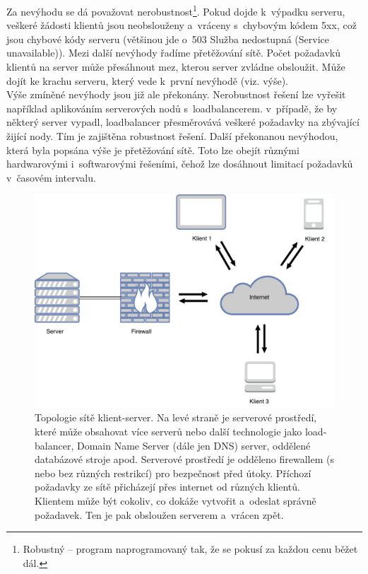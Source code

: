 
Za nevýhodu se dá považovat nerobustnost\footnote{Robustný -- program naprogramovaný tak, že se pokusí za každou cenu běžet dál.}. Pokud dojde k~výpadku serveru, veškeré žádosti klientů jsou neobslouženy a~vráceny s~chybovým kódem 5xx, což jsou chybové kódy serveru (většinou jde o~503 Služba nedostupná (Service unavailable)). Mezi další nevýhody řadíme přetěžování sítě. Počet požadavků klientů na server může přesáhnout mez, kterou server zvládne obsloužit. Může dojít ke krachu serveru, který vede k~první nevýhodě (viz. výše). \\
 
Výše zmíněné nevýhody jsou již ale překonány. Nerobustnost řešení lze vyřešit například aplikováním serverových nodů s~loadbalancerem. v~případě, že by některý server vypadl, loadbalancer přesměrovává veškeré požadavky na zbývající žijící nody. Tím je zajištěna robustnost řešení. Další překonanou nevýhodou, která byla popsána výše je přetěžování sítě. Toto lze obejít různými hardwarovými i~softwarovými řešeními, čehož lze dosáhnout limitací požadavků v~časovém intervalu.\cite{2, 3}

\begin{figure}[H]
	\centering
	\includegraphics[width=15cm]{../ClientServer.pdf}
	\caption{Topologie sítě klient-server. Na levé straně je serverové prostředí, které může obsahovat více serverů nebo další technologie jako load-balancer, Domain Name Server (dále jen DNS) server, oddělené databázové stroje apod. Serverové prostředí je odděleno firewallem (s nebo bez různých restrikcí) pro bezpečnost před útoky. Příchozí požadavky ze sítě přicházejí přes internet od různých klientů. Klientem může být cokoliv, co dokáže vytvořit a~odeslat správně požadavek. Ten je pak obsloužen serverem a~vrácen zpět. }
	\label{fig:ClientServer}
\end{figure}

